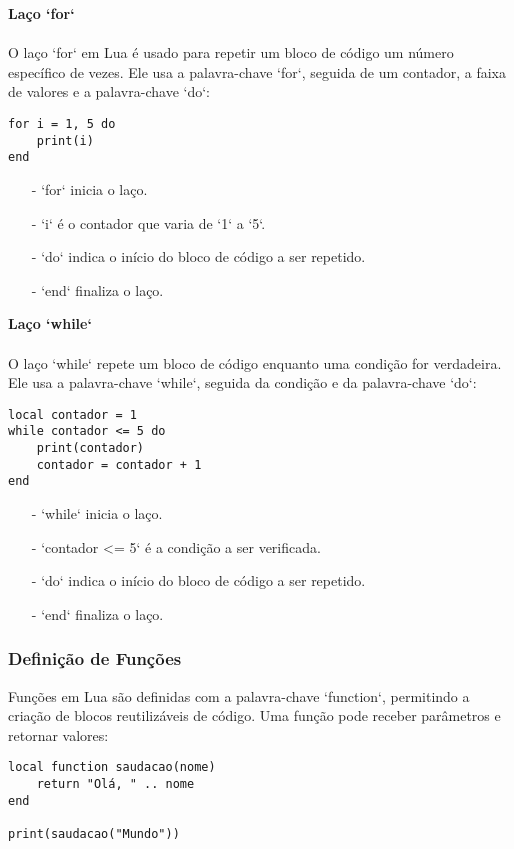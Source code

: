 \documentclass[12pt]{article}
\begin{document}
\noindent\textbf{Laço `for`}
\\\\
O laço `for` em Lua é usado para repetir um bloco de código um número específico de vezes. Ele usa a palavra-chave `for`, seguida de um contador, a faixa de valores e a palavra-chave `do`:

\begin{verbatim}
for i = 1, 5 do
    print(i)
end
\end{verbatim}

\begin{itemize}
  \item[-] `for` inicia o laço.
  \item[-] `i` é o contador que varia de `1` a `5`.
  \item[-] `do` indica o início do bloco de código a ser repetido.
  \item[-] `end` finaliza o laço.
\end{itemize}

\noindent\textbf{Laço `while`}
\\\\
O laço `while` repete um bloco de código enquanto uma condição for verdadeira. Ele usa a palavra-chave `while`, seguida da condição e da palavra-chave `do`:

\begin{verbatim}
local contador = 1
while contador <= 5 do
    print(contador)
    contador = contador + 1
end
\end{verbatim}

\begin{itemize}
  \item[-] `while` inicia o laço.
  \item[-] `contador <= 5` é a condição a ser verificada.
  \item[-] `do` indica o início do bloco de código a ser repetido.
  \item[-] `end` finaliza o laço.
\end{itemize}

\subsubsection{Definição de Funções}

Funções em Lua são definidas com a palavra-chave `function`, permitindo a criação de blocos reutilizáveis de código. Uma função pode receber parâmetros e retornar valores:

\begin{verbatim}
local function saudacao(nome)
    return "Olá, " .. nome
end

print(saudacao("Mundo"))
\end{verbatim}
\end{document}
